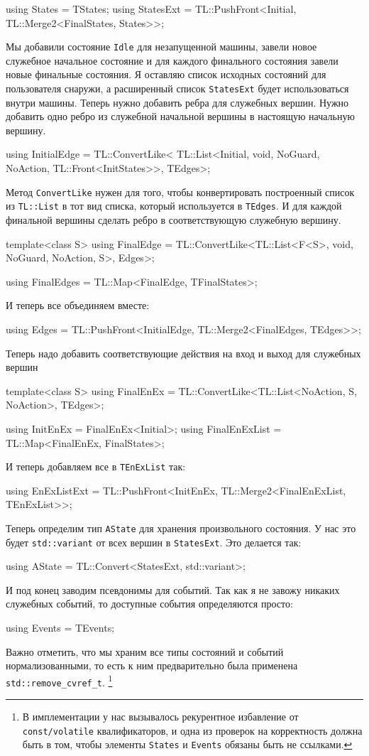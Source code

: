 \documentclass{article}
\begin{document}
{\begin{cppcode}[\nonumbers]
using States = TStates;
using StatesExt = TL::PushFront<Initial, TL::Merge2<FinalStates, States>>;
\end{cppcode}
Мы добавили состояние \verb"Idle" для незапущенной машины, завели новое служебное начальное состояние и для каждого финального состояния завели новые финальные состояния.
Я оставляю список исходных состояний для пользователя снаружи, а расширенный список \verb"StatesExt" будет использоваться внутри машины.
Теперь нужно добавить ребра для служебных вершин.
Нужно добавить одно ребро из служебной начальной вершины в настоящую начальную вершину.
\begin{cppcode}[\nonumbers]
using InitialEdge = TL::ConvertLike<
    TL::List<Initial, void, NoGuard, NoAction, TL::Front<InitStates>>, TEdges>;
\end{cppcode}
Метод \verb"ConvertLike" нужен для того, чтобы конвертировать построенный список из \verb"TL::List" в тот вид списка, который используется в \verb"TEdges".
И для каждой финальной вершины сделать ребро в соответствующую служебную вершину.
\begin{cppcode}[\nonumbers]
template<class S>
using FinalEdge = TL::ConvertLike<TL::List<F<S>, void, NoGuard, NoAction, S>, Edges>;

using FinalEdges = TL::Map<FinalEdge, TFinalStates>;
\end{cppcode}
И теперь все объединяем вместе:
\begin{cppcode}[\nonumbers]
using Edges = TL::PushFront<InitialEdge, TL::Merge2<FinalEdges, TEdges>>;
\end{cppcode}
Теперь надо добавить соответствующие действия на вход и выход для служебных вершин
\begin{cppcode}[\nonumbers]
template<class S>
using FinalEnEx = TL::ConvertLike<TL::List<NoAction, S, NoAction>, TEdges>;

using InitEnEx = FinalEnEx<Initial>;
using FinalEnExList = TL::Map<FinalEnEx, FinalStates>;
\end{cppcode}
И теперь добавляем все в \verb"TEnExList" так:
\begin{cppcode}[\nonumbers]
using EnExListExt = TL::PushFront<InitEnEx, TL::Merge2<FinalEnExList, TEnExList>>;
\end{cppcode}
Теперь определим тип \verb"AState" для хранения произвольного состояния.
У нас это будет \verb"std::variant" от всех вершин в \verb"StatesExt".
Это делается так:
\begin{cppcode}[\nonumbers]
using AState = TL::Convert<StatesExt, std::variant>;
\end{cppcode}
И под конец заводим псевдонимы для событий.
Так как я не завожу никаких служебных событий, то доступные события определяются просто:
\begin{cppcode}[\nonumbers]
using Events = TEvents;
\end{cppcode}
Важно отметить, что мы храним все типы состояний и событий нормализованными, то есть к ним предварительно была применена \verb"std::remove_cvref_t".%
\footnote{В имплементации у нас вызывалось рекурентное избавление от \texttt{const/volatile} квалификаторов, и одна из проверок на корректность должна быть в том, чтобы элементы \texttt{States} и \texttt{Events} обязаны быть не ссылками.}

}
\end{document}
